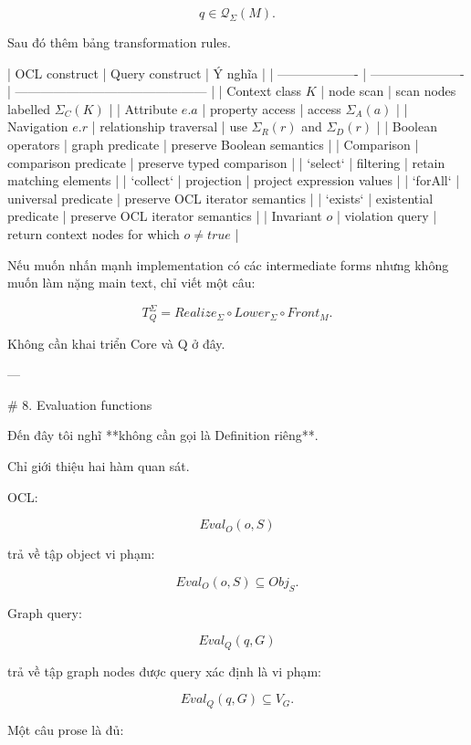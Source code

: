 $$
\boxed{
q\in\mathcal Q_\Sigma(M).
}
\tag{9}
$$

Sau đó thêm bảng transformation rules.

| OCL construct       | Query construct        | Ý nghĩa                                       |
| ------------------- | ---------------------- | --------------------------------------------- |
| Context class \(K\) | node scan              | scan nodes labelled \(\Sigma_C(K)\)           |
| Attribute \(e.a\)   | property access        | access \(\Sigma_A(a)\)                        |
| Navigation \(e.r\)  | relationship traversal | use \(\Sigma_R(r)\) and \(\Sigma_D(r)\)       |
| Boolean operators   | graph predicate        | preserve Boolean semantics                    |
| Comparison          | comparison predicate   | preserve typed comparison                     |
| `select`            | filtering              | retain matching elements                      |
| `collect`           | projection             | project expression values                     |
| `forAll`            | universal predicate    | preserve OCL iterator semantics               |
| `exists`            | existential predicate  | preserve OCL iterator semantics               |
| Invariant \(o\)     | violation query        | return context nodes for which \(o\neq true\) |

Nếu muốn nhấn mạnh implementation có các intermediate forms nhưng không muốn làm nặng main text, chỉ viết một câu:

$$
T_Q^\Sigma
=
Realize_\Sigma\circ Lower_\Sigma\circ Front_M.
$$

Không cần khai triển Core và Q ở đây.

---

# 8. Evaluation functions

Đến đây tôi nghĩ **không cần gọi là Definition riêng**.

Chỉ giới thiệu hai hàm quan sát.

OCL:

$$
Eval_O(o,S)
$$

trả về tập object vi phạm:

$$
\boxed{
Eval_O(o,S)\subseteq Obj_S.
}
\tag{10}
$$

Graph query:

$$
Eval_Q(q,G)
$$

trả về tập graph nodes được query xác định là vi phạm:

$$
\boxed{
Eval_Q(q,G)\subseteq V_G.
}
\tag{11}
$$

Một câu prose là đủ:

